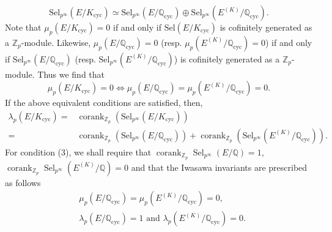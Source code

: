 \documentclass[12pt]{amsart}
\newcommand{\Z}{\mathbb{Z}}
\newcommand{\Q}{\mathbb{Q}}
\newcommand{\op}[1]{\operatorname{#1}}
\numberwithin{equation}{section}
\begin{document}
\[
    \mathrm{Sel}_{p^\infty}(E/K_{\mathrm{cyc}}) \simeq \mathrm{Sel}_{p^\infty}(E/\mathbb{Q}_{\mathrm{cyc}}) \oplus \mathrm{Sel}_{p^\infty}(E^{(K)}/\mathbb{Q}_{\mathrm{cyc}}).
    \]
    Note that $\mu_p(E/K_{\op{cyc}})=0$ if and only if $\mathrm{Sel}(E/K_{\mathrm{cyc}})$ is cofinitely generated as a $\Z_p$-module. Likewise, $\mu_p(E/\Q_{\op{cyc}})=0$ (resp. $\mu_p(E^{(K)}/\Q_{\op{cyc}})=0$) if and only if $\mathrm{Sel}_{p^\infty}(E/\Q_{\mathrm{cyc}})$ (resp. $\mathrm{Sel}_{p^\infty}(E^{(K)}/\Q_{\mathrm{cyc}})$) is cofinitely generated as a $\Z_p$-module. Thus we find that 
    \[\mu_p(E/K_{\op{cyc}})=0\Leftrightarrow \mu_p(E/\Q_{\op{cyc}})=\mu_p(E^{(K)}/\Q_{\op{cyc}})=0.\]
    If the above equivalent conditions are satisfied, then, 
    \[\begin{split}\lambda_p(E/K_{\op{cyc}})=&\op{corank}_{\Z_p} \left(\mathrm{Sel}_{p^\infty}(E/K_{\mathrm{cyc}})\right) \\ =&\op{corank}_{\Z_p} \left(\mathrm{Sel}_{p^\infty}(E/\Q_{\mathrm{cyc}})\right)+\op{corank}_{\Z_p} \left(\mathrm{Sel}_{p^\infty}(E^{(K)}/\Q_{\mathrm{cyc}})\right).\end{split}\]
For condition (3), we shall require that $\op{corank}_{\Z_p} \op{Sel}_{p^\infty}(E/\Q)=1$, $\op{corank}_{\Z_p} \op{Sel}_{p^\infty}(E^{(K)}/\Q)=0$ and that the Iwasawa invariants are prescribed as follows
\[\begin{split}& \mu_p(E/\Q_{\op{cyc}})=\mu_p(E^{(K)}/\Q_{\op{cyc}})=0,\\
& \lambda_p(E/\Q_{\op{cyc}})=1\text{ and }\lambda_p(E^{(K)}/\Q_{\op{cyc}})=0.\end{split}\]
\end{document}
